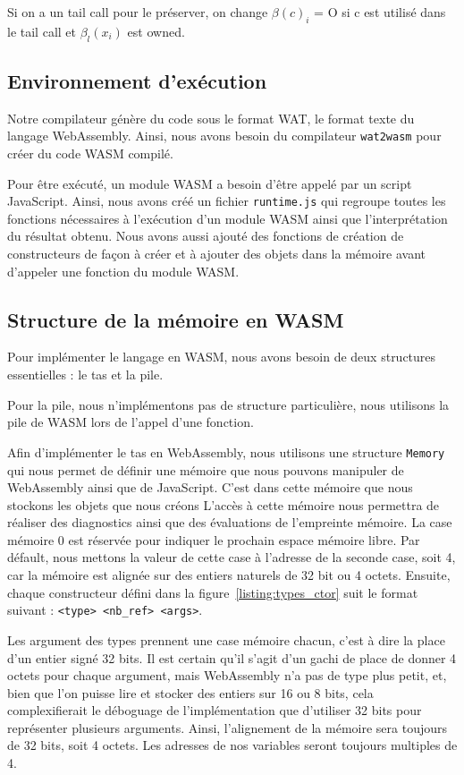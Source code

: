 \documentclass{rapportECL}
\begin{document}
Si on a un tail call pour le préserver, on change  $\beta(c)_i$ = O si c est utilisé dans le tail call et $\beta_l(x_i)$ est owned.

\subsection{Environnement d'exécution}

Notre compilateur génère du code sous le format WAT, le format texte du langage WebAssembly. Ainsi, nous avons besoin
du compilateur \verb|wat2wasm| pour créer du code WASM compilé.

Pour être exécuté, un module WASM a besoin d'être appelé par un script JavaScript. Ainsi, nous avons créé un fichier 
\verb|runtime.js| qui regroupe toutes les fonctions nécessaires à l'exécution d'un module WASM ainsi que l'interprétation
du résultat obtenu. Nous avons aussi ajouté des fonctions de création de constructeurs de façon à créer et à ajouter des objets 
dans la mémoire avant d'appeler une fonction du module WASM.

\subsection{Structure de la mémoire en WASM}

Pour implémenter le langage en WASM, nous avons besoin de deux structures essentielles : le tas et la pile.

\medskip

Pour la pile, nous n'implémentons pas de structure particulière, nous utilisons la pile de WASM lors de l'appel d'une fonction.

\medskip

Afin d'implémenter le tas en WebAssembly, nous utilisons une structure \verb|Memory| qui nous permet de définir une mémoire que 
nous pouvons manipuler de WebAssembly ainsi que de JavaScript.
C'est dans cette mémoire que nous stockons les objets que nous créons
L'accès à cette mémoire nous permettra de réaliser des diagnostics ainsi que des évaluations de l'empreinte mémoire.
La case mémoire 0 est réservée pour indiquer le prochain espace mémoire libre. Par défault, nous mettons la valeur de cette case à 
l'adresse de la seconde case, soit 4, car la mémoire est alignée sur des entiers naturels de 32 bit ou 4 octets.
Ensuite, chaque constructeur défini dans la figure~\ref{listing:types_ctor} suit le format suivant : \verb|<type> <nb_ref> <args>|. 

Les argument des types prennent une case mémoire chacun, c'est à dire la place d'un entier signé 32 bits. 
Il est certain qu'il s'agit d'un gachi de place de donner 4 octets pour chaque argument, mais WebAssembly n'a pas de type plus
petit, et, bien que l'on puisse lire et stocker des entiers sur 16 ou 8 bits,
cela complexifierait le déboguage de l'implémentation que d'utiliser 32 bits pour représenter plusieurs arguments.
Ainsi, l'alignement de la mémoire sera toujours de 32 bits, soit 4 octets. Les adresses de nos variables seront toujours 
multiples de 4.
\end{document}

